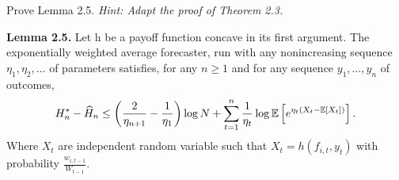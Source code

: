 \begin{exercise}[]{}
	Prove Lemma 2.5. \it{Hint:} Adapt the proof of Theorem 2.3.

\textbf{Lemma 2.5.} Let h be a payoff function concave in its first argument. The exponentially weighted average forecaster, run with any nonincreasing sequence $ \eta_1,\eta_2,\ldots $ of parameters satisfies, for any $  n \geq 1 $ and for any sequence $ y_1,\ldots,y_n $ of outcomes,
\begin{equation*}
	H_n^{*} - \widehat{H}_n \leq \left( \frac{2}{\eta_{n+1}} - \frac{1}{\eta_1} \right) \log N + \sum_{t=1}^{n} \frac{1}{\eta_t} \log \mathbb{E}\left[e^{\eta_t(X_t - \mathbb{E}\left[X_t\right])}\right].
\end{equation*}
Where $ X_t $ are independent random variable such that $ X_t = h(f_{i,t},y_t) $ with probability $ \frac{w_{i,t-1}}{W_{t-1}} $.
\end{exercise}

